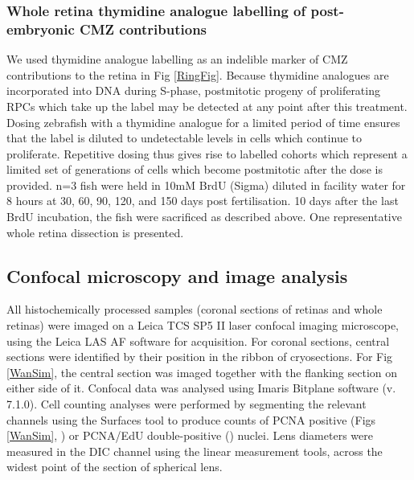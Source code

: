 \documentclass[10pt,letterpaper]{article}
\begin{document}
\subsubsection*{Whole retina thymidine analogue labelling of post-embryonic CMZ contributions}
We used thymidine analogue labelling as an indelible marker of CMZ contributions to the retina in Fig \ref{RingFig}. Because thymidine analogues are incorporated into DNA during S-phase, postmitotic progeny of proliferating RPCs which take up the label may be detected at any point after this treatment. Dosing zebrafish with a thymidine analogue for a limited period of time ensures that the label is diluted to undetectable levels in cells which continue to proliferate. Repetitive dosing thus gives rise to labelled cohorts which represent a limited set of generations of cells which become postmitotic after the dose is provided. n=3 fish were held in 10mM BrdU (Sigma) diluted in facility water for 8 hours at 30, 60, 90, 120, and 150 days post fertilisation. 10 days after the last BrdU incubation, the fish were sacrificed as described above. One representative whole retina dissection is presented.

\subsection*{Confocal microscopy and image analysis}
All histochemically processed samples (coronal sections of retinas and whole retinas) were imaged on a Leica TCS SP5 II laser confocal imaging microscope, using the Leica LAS AF software for acquisition. For coronal sections, central sections were identified by their position in the ribbon of cryosections. For Fig \ref{WanSim}, the central section was imaged together with the flanking section on either side of it. Confocal data was analysed using Imaris Bitplane software (v. 7.1.0). Cell counting analyses were performed by segmenting the relevant channels using the Surfaces tool to produce counts of PCNA positive (Figs \ref{WanSim}, ) or PCNA/EdU double-positive () nuclei. Lens diameters were measured in the DIC channel using the linear measurement tools, across the widest point of the section of spherical lens.
\end{document}
